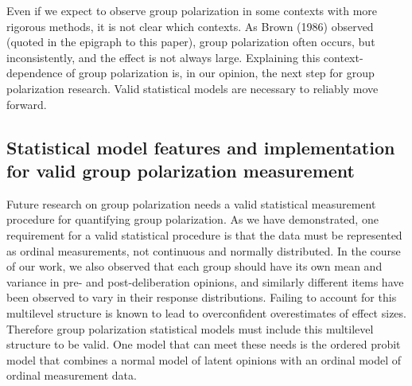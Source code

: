 Even if we expect to observe group polarization in some
contexts with more rigorous methods, it is not clear which contexts. 
As Brown (1986) observed (quoted in the epigraph to this paper), 
group polarization often occurs, 
but inconsistently, and the effect is not 
always large. Explaining this context-dependence of group polarization 
is, in our opinion, the next step for group polarization research. Valid 
statistical models are necessary to reliably move forward.


\subsection{Statistical model features and implementation for valid group polarization measurement}

Future research on group polarization needs a valid statistical measurement
procedure for quantifying group polarization. As we have demonstrated, one requirement
for a valid statistical procedure is that the data must be represented as
ordinal measurements, not continuous and normally distributed.  
In the course of our work, we also observed that each group should have its own
mean and variance in pre- and post-deliberation opinions, and similarly
different items have been observed to vary in their response distributions.
Failing to account for this multilevel structure is known to lead to overconfident
overestimates of effect sizes. Therefore
group polarization statistical models must include this multilevel structure
to be valid. One model that can meet these needs is the ordered probit model
that combines a normal model of latent opinions with an ordinal model of
ordinal measurement data. 



